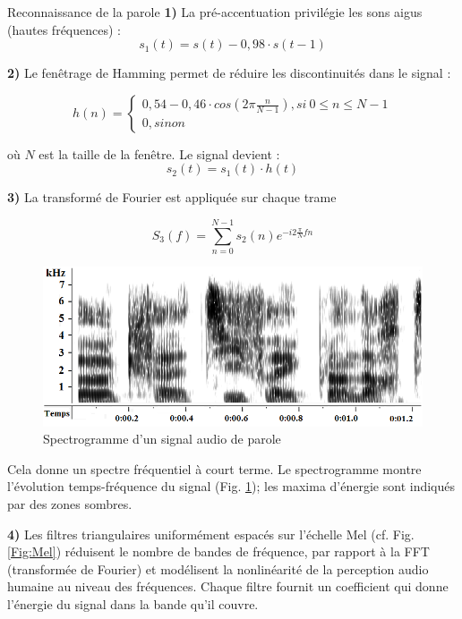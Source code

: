 \documentclass{style/these}
\begin{document}
\begin{part}{Reconnaissance de la parole}
\textbf{1)}  La pré-accentuation privilégie les sons aigus (hautes fréquences) :
\begin{equation}
s_{1}(t) = s(t) - 0,98 \cdot s(t - 1)
\end{equation}


\textbf{2)} Le fenêtrage de Hamming permet de réduire les discontinuités dans le signal :

\begin{equation}
h(n)=\left\{\begin{matrix}
0,54 - 0,46 \cdot cos(2\pi \frac{n}{N-1}), si\ 0\leq n \leq N-1 \\ 
0, sinon
\end{matrix}\right.
\end{equation}

\hskip-18pt où $N$ est la taille de la fenêtre. Le signal devient :
\begin{equation}
s_{2}(t) = s_1(t) \cdot h(t)
\end{equation}


\textbf{3)} La transformé de Fourier est appliquée sur chaque trame 

\begin{equation}
S_{3}(f) = \sum\limits_{n=0}^{N-1}s_{2}(n)e^{-i2\frac{\pi}{N}fn}
\end{equation}

\begin{figure}[h!]
\begin{center}
\includegraphics[scale=0.44]{images/pictures/spectrogramme.png}
\end{center}
\caption{Spectrogramme d'un signal audio de parole}
\label{Fig:spectrogramme}
\end{figure}


Cela donne un spectre fréquentiel à court terme. 
Le spectrogramme montre l'évolution temps-fréquence du signal (Fig. \ref{Fig:spectrogramme}); les maxima d'énergie sont indiqués par des zones sombres.


\textbf{4)} Les filtres triangulaires uniformément espacés sur l'échelle Mel (cf. Fig. \ref{Fig:Mel}) réduisent le nombre de bandes de fréquence, par rapport à la FFT (transformée de Fourier) et modélisent la nonlinéarité de la perception audio humaine au niveau des fréquences. 
Chaque filtre fournit un coefficient qui donne l'énergie du signal dans la bande qu'il couvre.


\end{part}
\end{document}
